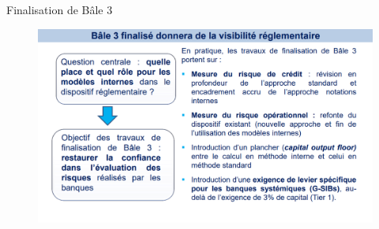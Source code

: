 \begin{frame}{Finalisation de Bâle 3}
    \begin{figure}[h]
        \centering
        \includegraphics[scale=0.43]{Frames/Les Accords de Bale/b7.png}
    \end{figure}
\end{frame}